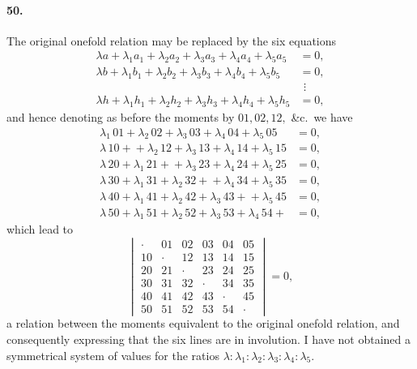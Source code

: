 \documentclass[11pt,a4paper]{article}
\begin{document}
\paragraph{50.}
The original onefold relation may be replaced by the six equations
\begin{align*}
\lambda a + \lambda_1 a_1 + \lambda_2 a_2 + \lambda_3 a_3 + \lambda_4 a_4 + \lambda_5 a_5 &= 0, \\
\lambda b + \lambda_1 b_1 + \lambda_2 b_2 + \lambda_3 b_3 + \lambda_4 b_4 + \lambda_5 b_5 &= 0, \\
&\ \,\vdots \\
\lambda h + \lambda_1 h_1 + \lambda_2 h_2 + \lambda_3 h_3 + \lambda_4 h_4 + \lambda_5 h_5 &= 0,
\end{align*}
and hence denoting as before the moments by $01, 02, 12,$ \&c.\ we have
\begin{align*}
\lambda_1\,01 + \lambda_2\,02 + \lambda_3\,03 + \lambda_4\,04 + \lambda_5\,05 &= 0, \\
\lambda\,10 + {} + \lambda_2\,12 + \lambda_3\,13 + \lambda_4\,14 + \lambda_5\,15 &= 0, \\
\lambda\,20 + \lambda_1\,21 + {} + \lambda_3\,23 + \lambda_4\,24 + \lambda_5\,25 &= 0, \\
\lambda\,30 + \lambda_1\,31 + \lambda_2\,32 + {} + \lambda_4\,34 + \lambda_5\,35 &= 0, \\
\lambda\,40 + \lambda_1\,41 + \lambda_2\,42 + \lambda_3\,43 + {} + \lambda_5\,45 &= 0, \\
\lambda\,50 + \lambda_1\,51 + \lambda_2\,52 + \lambda_3\,53 + \lambda_4\,54 + {} &= 0,
\end{align*}
which lead to
\[
\begin{vmatrix}
\cdot & 01 & 02 & 03 & 04 & 05 \\
10 & \cdot & 12 & 13 & 14 & 15 \\
20 & 21 & \cdot & 23 & 24 & 25 \\
30 & 31 & 32 & \cdot & 34 & 35 \\
40 & 41 & 42 & 43 & \cdot & 45 \\
50 & 51 & 52 & 53 & 54 & \cdot
\end{vmatrix} = 0,
\]
a relation between the moments equivalent to the original onefold relation, and
consequently expressing that the six lines are in involution. I have not obtained a
symmetrical system of values for the ratios $\lambda : \lambda_1 : \lambda_2 : \lambda_3 : \lambda_4 : \lambda_5$.
\end{document}
